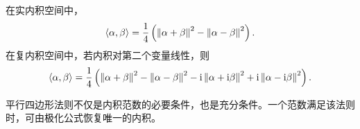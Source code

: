 \begin{theorem}[极化恒等式]
在实内积空间中，
\begin{equation}
 \left\langle \alpha,\beta\right\rangle
 =\frac14\left(
 \left\lVert \alpha+\beta\right\rVert^2-\left\lVert \alpha-\beta\right\rVert^2
 \right).
\end{equation}
在复内积空间中，若内积对第二个变量线性，则
\begin{equation}
 \left\langle \alpha,\beta\right\rangle
 =\frac14\left(
 \left\lVert \alpha+\beta\right\rVert^2-\left\lVert \alpha-\beta\right\rVert^2
 -\mathrm i\left\lVert \alpha+\mathrm i\beta\right\rVert^2
 +\mathrm i\left\lVert \alpha-\mathrm i\beta\right\rVert^2
 \right).
\end{equation}
\end{theorem}

\begin{remark}
平行四边形法则不仅是内积范数的必要条件，也是充分条件。一个范数满足该法则时，可由极化公式恢复唯一的内积。
\end{remark}
